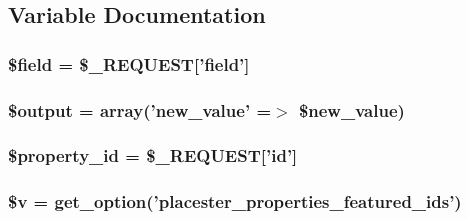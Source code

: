 \subsection{Variable Documentation}
\hypertarget{properties__ajax_8php_a83e4d6721f3491a4fd780dbd3ce1a3c0}{
\subsubsection[{\$field}]{\setlength{\rightskip}{0pt plus 5cm}\$field = \$\_\-REQUEST\mbox{[}'field'\mbox{]}}}
\label{dd/d22/properties__ajax_8php_a83e4d6721f3491a4fd780dbd3ce1a3c0}
\hypertarget{properties__ajax_8php_a73004ce9cd673c1bfafd1dc351134797}{
\subsubsection[{\$output}]{\setlength{\rightskip}{0pt plus 5cm}\$output = array('new\_\-value' =$>$ \$new\_\-value)}}
\label{dd/d22/properties__ajax_8php_a73004ce9cd673c1bfafd1dc351134797}
\hypertarget{properties__ajax_8php_a88c3dc31d5eb48b33b9ed5cfe1ffd62f}{
\subsubsection[{\$property\_\-id}]{\setlength{\rightskip}{0pt plus 5cm}\$property\_\-id = \$\_\-REQUEST\mbox{[}'id'\mbox{]}}}
\label{dd/d22/properties__ajax_8php_a88c3dc31d5eb48b33b9ed5cfe1ffd62f}
\hypertarget{properties__ajax_8php_ad1c227dc9d92d82b36539080e8c6dff9}{
\subsubsection[{\$v}]{ \$v = get\_\-option('placester\_\-properties\_\-featured\_\-ids')}}
\label{dd/d22/properties__ajax_8php_ad1c227dc9d92d82b36539080e8c6dff9}
